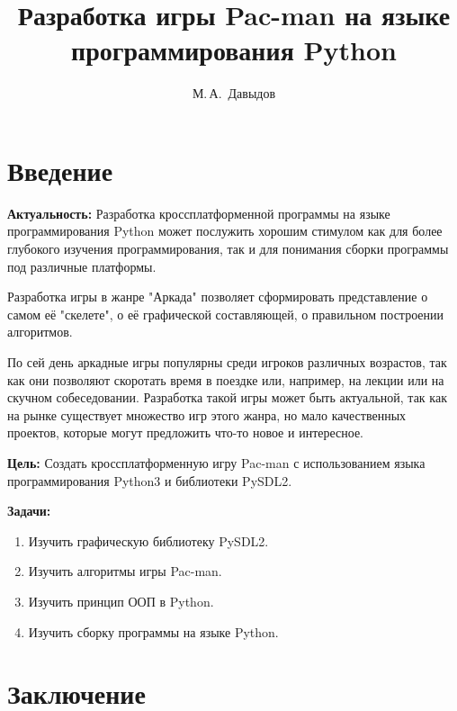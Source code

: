 \documentclass[14pt, oneside]{altsu-report}
\title{Разработка игры Pac-man на языке программирования Python}
\author{М.\,А.~Давыдов}
\institute{Институт цифровых технологий, электроники и физики}
\date{\the\year}
\begin{document}
\maketitle

\setcounter{page}{2}
\makeabstract
\tableofcontents

\chapter*{Введение}

\textbf{Актуальность:}
Разработка кроссплатформенной программы на языке программирования Python может послужить хорошим стимулом как для более глубокого изучения программирования, так и для понимания сборки программы под различные платформы.

Разработка игры в жанре "Аркада" позволяет сформировать представление о самом её "скелете", о её графической составляющей, о правильном построении алгоритмов.

По сей день аркадные игры популярны среди игроков различных возрастов, так как они позволяют скоротать время в поездке или, например, на лекции или на скучном собеседовании. Разработка такой игры может быть актуальной, так как на рынке существует множество игр этого жанра, но мало качественных проектов, которые могут предложить что-то новое и интересное.

\textbf{Цель:}
Создать кроссплатформенную игру Pac-man с использованием языка программирования Python3 и библиотеки PySDL2.

\textbf{Задачи:}
\begin{enumerate}
	\item Изучить графическую библиотеку PySDL2.
	\item Изучить алгоритмы игры Pac-man.
	\item Изучить принцип ООП в Python.
	\item Изучить сборку программы на языке Python.
\end{enumerate}





\chapter*{Заключение}
\end{document}
